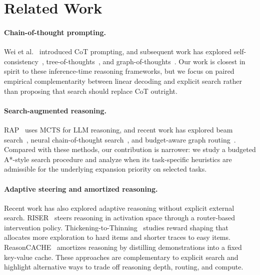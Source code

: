 \documentclass[11pt]{article}
\begin{document}
\section{Related Work}
\label{sec:related}

\paragraph{Chain-of-thought prompting.} Wei et al.~\cite{wei2022chain} introduced CoT prompting, and subsequent work has explored self-consistency~\cite{wang2022self}, tree-of-thoughts~\cite{yao2024tree}, and graph-of-thoughts~\cite{besta2024graph}. Our work is closest in spirit to these inference-time reasoning frameworks, but we focus on paired empirical complementarity between linear decoding and explicit search rather than proposing that search should replace CoT outright.

\paragraph{Search-augmented reasoning.} RAP~\cite{hao2023reasoning} uses MCTS for LLM reasoning, and recent work has explored beam search~\cite{xie2024self}, neural chain-of-thought search~\cite{ling2026ncots}, and budget-aware graph routing~\cite{liu2026routegot}. Compared with these methods, our contribution is narrower: we study a budgeted A*-style search procedure and analyze when its task-specific heuristics are admissible for the underlying expansion priority on selected tasks.

\paragraph{Adaptive steering and amortized reasoning.} Recent work has also explored adaptive reasoning without explicit external search. RISER~\cite{ye2026riser} steers reasoning in activation space through a router-based intervention policy. Thickening-to-Thinning~\cite{lin2026thickening} studies reward shaping that allocates more exploration to hard items and shorter traces to easy items. ReasonCACHE~\cite{gupta2026reasoncache} amortizes reasoning by distilling demonstrations into a fixed key-value cache. These approaches are complementary to explicit search and highlight alternative ways to trade off reasoning depth, routing, and compute.
\end{document}
